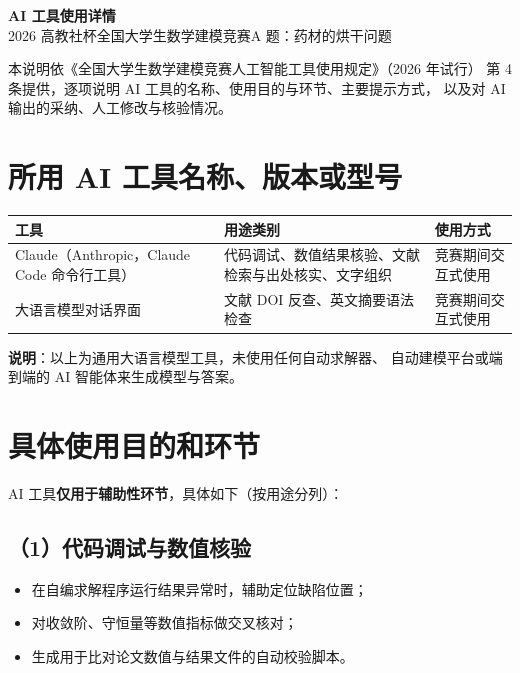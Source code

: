 \documentclass[UTF8, a4paper, 11pt, fontset=windows]{ctexart}
\begin{document}
\begin{center}
  {\LARGE\bfseries AI 工具使用详情}\\[4pt]
  {\large 2026 高教社杯全国大学生数学建模竞赛\quad A 题：药材的烘干问题}
\end{center}
\vspace{4pt}

\noindent 本说明依《全国大学生数学建模竞赛人工智能工具使用规定》（2026 年试行）
第 4 条提供，逐项说明 AI 工具的名称、使用目的与环节、主要提示方式，
以及对 AI 输出的采纳、人工修改与核验情况。

\section{所用 AI 工具名称、版本或型号}

\begin{table}[h]
  \centering
  \small
  \begin{tabularx}{\textwidth}{@{}lXl@{}}
    \toprule
    工具 & 用途类别 & 使用方式 \\
    \midrule
    Claude（Anthropic，Claude Code 命令行工具） &
      代码调试、数值结果核验、文献检索与出处核实、文字组织 &
      竞赛期间交互式使用 \\
    大语言模型对话界面 &
      文献 DOI 反查、英文摘要语法检查 &
      竞赛期间交互式使用 \\
    \bottomrule
  \end{tabularx}
\end{table}

\noindent\textbf{说明}：以上为通用大语言模型工具，未使用任何自动求解器、
自动建模平台或端到端的 AI 智能体来生成模型与答案。

\section{具体使用目的和环节}

AI 工具\textbf{仅用于辅助性环节}，具体如下（按用途分列）：

\subsection*{（1）代码调试与数值核验}

\begin{itemize}[leftmargin=1.6em, itemsep=2pt]
  \item 在自编求解程序运行结果异常时，辅助定位缺陷位置；
  \item 对收敛阶、守恒量等数值指标做交叉核对；
  \item 生成用于比对论文数值与结果文件的自动校验脚本。
\end{itemize}
\end{document}
